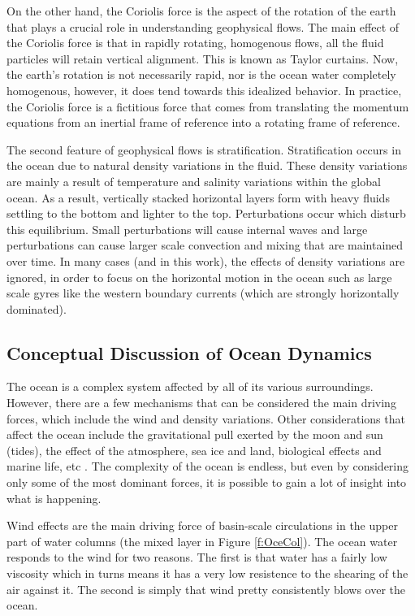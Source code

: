 On the other hand, the Coriolis force is the aspect of the rotation of the earth that plays a crucial role in understanding geophysical flows.  The main effect of the Coriolis force is that in rapidly rotating, homogenous flows, all the fluid particles will retain vertical alignment.  This is known as Taylor curtains.  Now, the earth's rotation is not necessarily rapid, nor is the ocean water completely homogenous, however, it does tend towards this idealized behavior.  In practice, the Coriolis force is a fictitious force that comes from translating the momentum equations from an inertial frame of reference into a rotating frame of reference.

The second feature of geophysical flows is stratification.  Stratification occurs in the ocean due to natural density variations in the fluid.  These density variations are mainly a result of temperature and salinity variations within the global ocean.  As a result, vertically stacked horizontal layers form with heavy fluids settling to the bottom and lighter to the top.  Perturbations occur which disturb this equilibrium.  Small perturbations will cause internal waves and large perturbations can cause larger scale convection and mixing that are maintained over time. In many cases (and in this work), the effects of density variations are ignored, in order to focus on the horizontal motion in the ocean such as  large scale gyres like the western boundary currents (which are strongly horizontally dominated).  \cite{94CushRoi}

\subsection{Conceptual Discussion of Ocean Dynamics}

The ocean is a complex system affected by all of its various surroundings.  However, there are a few mechanisms that can be considered the main driving forces, which include the wind and density variations.  Other considerations that affect the ocean include the gravitational pull exerted by the moon and sun (tides), the effect of the atmosphere, sea ice and land, biological effects and marine life, etc .  The complexity of the ocean is endless, but even by considering only some of the most dominant forces, it is possible to gain a lot of insight into what is happening.

Wind effects are the main driving force of basin-scale circulations in the upper part of water columns (the mixed layer in Figure \protect \ref{f:OceCol}).  The ocean water responds to the wind for two reasons.  The first is that water has a fairly low viscosity which in turns means it has a very low resistence to the shearing of the air against it.  The second is simply that wind pretty consistently blows over the ocean.


